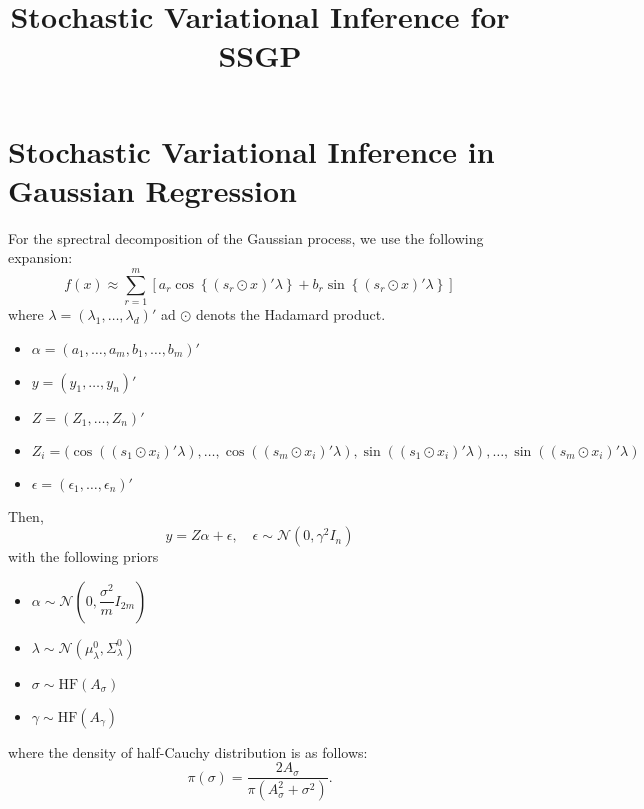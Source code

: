 \documentclass[12pt]{article}
\begin{document}
\title{Stochastic Variational Inference for SSGP}

\section{Stochastic Variational Inference in Gaussian Regression}
  For the sprectral decomposition of the Gaussian process, we use the following expansion:
  \begin{equation}
    f(x) \approx \sum_{r=1}^{m}\left[a_{r}\cos\left\{\left(s_{r}\odot x\right)'\lambda\right\}+b_{r}\sin\left\{\left(s_{r}\odot x\right)'\lambda\right\}\right]
  \end{equation}
  where $\lambda=(\lambda_{1},\ldots,\lambda_{d})'$ ad $\odot$ denots the Hadamard product.
  \begin{itemize}
    \item $\alpha=(a_{1},\ldots,a_{m},b_{1},\ldots,b_{m})'$
    \item $y = (y_{1},\ldots,y_{n})'$
    \item $Z = (Z_{1},\ldots,Z_{n})'$
    \item $Z_{i} = (\cos((s_{1}\odot x_{i})'\lambda),\ldots, \cos((s_{m}\odot x_{i})'\lambda),\sin((s_{1}\odot x_{i})'\lambda),\ldots,\sin((s_{m}\odot x_{i})'\lambda)$
    \item $\epsilon = (\epsilon_{1},\ldots,\epsilon_{n})'$
  \end{itemize}
  Then,
  \begin{equation}
    y = Z\alpha+\epsilon, \quad \epsilon\sim\mathcal{N}\left(0,\gamma^{2}I_{n}\right)
  \end{equation}
  with the following priors
  \begin{itemize}
    \item $\alpha\sim\mathcal{N}\left(0,\dfrac{\sigma^{2}}{m}I_{2m}\right)$
    \item $\lambda \sim \mathcal{N}\left(\mu_{\lambda}^{0},\Sigma_{\lambda}^{0}\right)$
    \item $\sigma \sim \mathrm{HF}\left(A_{\sigma}\right)$
    \item $\gamma \sim \mathrm{HF}\left(A_{\gamma}\right)$
  \end{itemize}
  where the density of half-Cauchy distribution is as follows:
\begin{equation}
  \pi(\sigma) = \dfrac{2A_{\sigma}}{\pi\left(A_{\sigma}^{2}+\sigma^{2}\right)}.
\end{equation}
\end{document}
